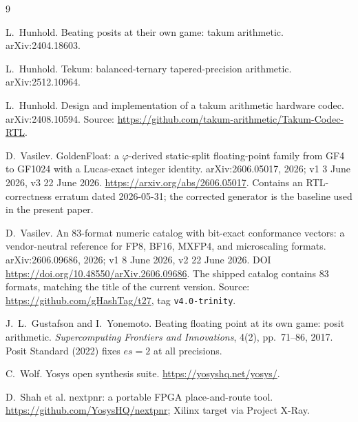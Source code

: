 \documentclass[11pt]{article}
\theoremstyle{definition}
\begin{document}
\begin{thebibliography}{9}

L.~Hunhold.
\newblock Beating posits at their own game: takum arithmetic.
\newblock arXiv:2404.18603.

L.~Hunhold.
\newblock Tekum: balanced-ternary tapered-precision arithmetic.
\newblock arXiv:2512.10964.

L.~Hunhold.
\newblock Design and implementation of a takum arithmetic hardware codec.
\newblock arXiv:2408.10594. Source: \url{https://github.com/takum-arithmetic/Takum-Codec-RTL}.

D.~Vasilev.
\newblock GoldenFloat: a $\varphi$-derived static-split floating-point family
from GF4 to GF1024 with a Lucas-exact integer identity.
\newblock arXiv:2606.05017, 2026; v1 3 June 2026, v3 22 June 2026.
\newblock \url{https://arxiv.org/abs/2606.05017}.
\newblock Contains an RTL-correctness erratum dated 2026-05-31; the corrected
generator is the baseline used in the present paper.

D.~Vasilev.
\newblock An 83-format numeric catalog with bit-exact conformance vectors: a
vendor-neutral reference for FP8, BF16, MXFP4, and microscaling formats.
\newblock arXiv:2606.09686, 2026; v1 8 June 2026, v2 22 June 2026.
\newblock DOI \url{https://doi.org/10.48550/arXiv.2606.09686}.
\newblock The shipped catalog contains 83 formats, matching the title of the
current version. Source: \url{https://github.com/gHashTag/t27}, tag
\texttt{v4.0-trinity}.

J.~L.~Gustafson and I.~Yonemoto.
\newblock Beating floating point at its own game: posit arithmetic.
\newblock \emph{Supercomputing Frontiers and Innovations}, 4(2), pp.~71--86, 2017.
\newblock Posit Standard (2022) fixes $es=2$ at all precisions.

C.~Wolf.
\newblock Yosys open synthesis suite.
\newblock \url{https://yosyshq.net/yosys/}.

D.~Shah et al.
\newblock nextpnr: a portable FPGA place-and-route tool.
\newblock \url{https://github.com/YosysHQ/nextpnr}; Xilinx target via Project X-Ray.


\end{thebibliography}
\end{document}
